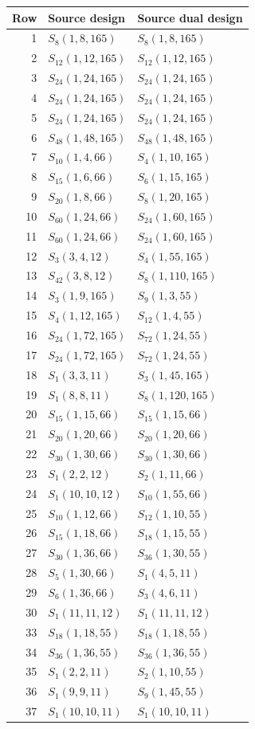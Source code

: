 \begin{center}\small
\begin{tabular}{rll}
\toprule
Row & Source design & Source dual design\\
\midrule
1 & $S_{8}(1,8,165)$ & $S_{8}(1,8,165)$\\
2 & $S_{12}(1,12,165)$ & $S_{12}(1,12,165)$\\
3 & $S_{24}(1,24,165)$ & $S_{24}(1,24,165)$\\
4 & $S_{24}(1,24,165)$ & $S_{24}(1,24,165)$\\
5 & $S_{24}(1,24,165)$ & $S_{24}(1,24,165)$\\
6 & $S_{48}(1,48,165)$ & $S_{48}(1,48,165)$\\
7 & $S_{10}(1,4,66)$ & $S_{4}(1,10,165)$\\
8 & $S_{15}(1,6,66)$ & $S_{6}(1,15,165)$\\
9 & $S_{20}(1,8,66)$ & $S_{8}(1,20,165)$\\
10 & $S_{60}(1,24,66)$ & $S_{24}(1,60,165)$\\
11 & $S_{60}(1,24,66)$ & $S_{24}(1,60,165)$\\
12 & $S_{3}(3,4,12)$ & $S_{4}(1,55,165)$\\
13 & $S_{42}(3,8,12)$ & $S_{8}(1,110,165)$\\
14 & $S_{3}(1,9,165)$ & $S_{9}(1,3,55)$\\
15 & $S_{4}(1,12,165)$ & $S_{12}(1,4,55)$\\
16 & $S_{24}(1,72,165)$ & $S_{72}(1,24,55)$\\
17 & $S_{24}(1,72,165)$ & $S_{72}(1,24,55)$\\
18 & $S_{1}(3,3,11)$ & $S_{3}(1,45,165)$\\
19 & $S_{1}(8,8,11)$ & $S_{8}(1,120,165)$\\
20 & $S_{15}(1,15,66)$ & $S_{15}(1,15,66)$\\
21 & $S_{20}(1,20,66)$ & $S_{20}(1,20,66)$\\
22 & $S_{30}(1,30,66)$ & $S_{30}(1,30,66)$\\
23 & $S_{1}(2,2,12)$ & $S_{2}(1,11,66)$\\
24 & $S_{1}(10,10,12)$ & $S_{10}(1,55,66)$\\
25 & $S_{10}(1,12,66)$ & $S_{12}(1,10,55)$\\
26 & $S_{15}(1,18,66)$ & $S_{18}(1,15,55)$\\
27 & $S_{30}(1,36,66)$ & $S_{36}(1,30,55)$\\
28 & $S_{5}(1,30,66)$ & $S_{1}(4,5,11)$\\
29 & $S_{6}(1,36,66)$ & $S_{3}(4,6,11)$\\
30 & $S_{1}(11,11,12)$ & $S_{1}(11,11,12)$\\
33 & $S_{18}(1,18,55)$ & $S_{18}(1,18,55)$\\
34 & $S_{36}(1,36,55)$ & $S_{36}(1,36,55)$\\
35 & $S_{1}(2,2,11)$ & $S_{2}(1,10,55)$\\
36 & $S_{1}(9,9,11)$ & $S_{9}(1,45,55)$\\
37 & $S_{1}(10,10,11)$ & $S_{1}(10,10,11)$\\
\bottomrule
\end{tabular}
\end{center}
